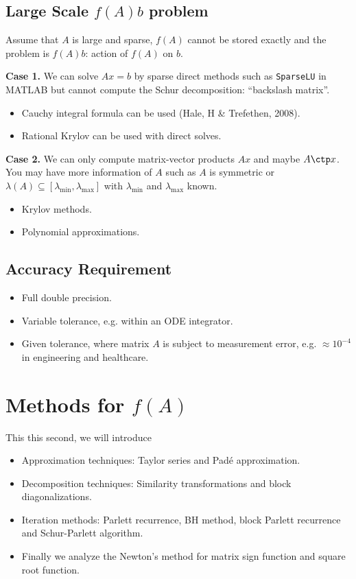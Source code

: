 \documentclass{article}
\begin{document}
\subsection{Large Scale $f(A)b$ problem}
Assume that $A$ is large and sparse, $f(A)$ cannot be stored exactly and
the problem is $f(A)b$: action of $f(A)$ on $b$.

\textbf{Case 1.} We can solve $Ax=b$ by sparse direct methods such as
\texttt{SparseLU} in MATLAB but cannot compute the Schur decomposition:
``backslash matrix''.
\begin{itemize}
    \item Cauchy integral formula can be used (Hale, H \& Trefethen,
    2008).
    \item Rational Krylov can be used with direct solves.
\end{itemize}

\textbf{Case 2.} We can only compute matrix-vector products $Ax$ and
maybe $A\ctp x$. You may have more information of $A$ such as $A$ is
symmetric or $\lambda(A) \subseteq [\lambda_{\min}, \lambda_{\max}]$
with $\lambda_{\min}$ and $\lambda_{\max}$ known.
\begin{itemize}
    \item Krylov methods.
    \item Polynomial approximations.
\end{itemize}

\subsection{Accuracy Requirement}
\begin{itemize}
    \item Full double precision.
    \item Variable tolerance, e.g. within an ODE integrator.
    \item Given tolerance, where matrix $A$ is subject to measurement
    error, e.g. $\approx 10^{-4}$ in engineering and healthcare.
\end{itemize}

\section{Methods for $f(A)$}
This this second, we will introduce
\begin{itemize}
    \item Approximation techniques: Taylor series and Pad\'e
    approximation.
    \item Decomposition techniques: Similarity transformations and block
    diagonalizations.
    \item Iteration methods: Parlett recurrence, BH method, block
    Parlett recurrence and Schur-Parlett algorithm.
    \item Finally we analyze the Newton's method for matrix sign
    function and square root function.
\end{itemize}
\end{document}
